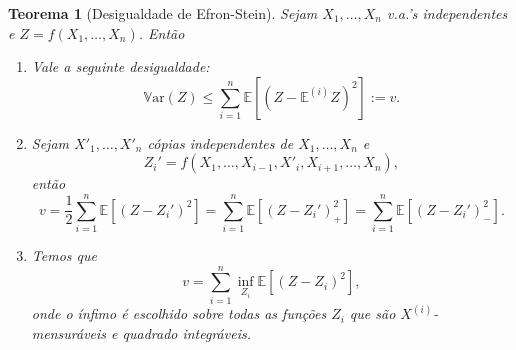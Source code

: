 \documentclass[12pt,a4paper,oneside]{book}
\newtheorem{theorem}{Teorema}[section]
\theoremstyle{definition}
\theoremstyle{remark}
\numberwithin{equation}{section}
\newcommand{\E}{\mathbb{E}}
\newcommand{\Var}{\mathbb{V}\text{ar}}
\begin{document}
\begin{theorem}[Desigualdade de Efron-Stein]\label{des-efron-stein} Sejam $X_1,\dots, X_n$ v.a.'s independentes e $Z = f(X_1,\dots,X_n)$. Então
\begin{enumerate}
\item Vale a seguinte desigualdade:
$$\Var(Z)\leq \sum_{i=1}^n \E\left[\left( Z-\E^{(i)}Z\right)^2\right] := v . $$
\item Sejam $X'_1,\dots, X'_n$ cópias independentes de $X_1,\dots, X_n$ e  
$$Z_i' = f(X_1,\dots,X_{i-1},X'_i,X_{i+1},\dots,X_n),$$ então
$$v = \dfrac{1}{2}\sum_{i=1}^n\E\left[\left(Z-Z_i' \right)^2\right]=\sum_{i=1}^n\E\left[\left(Z-Z_i' \right)_+^2\right]=\sum_{i=1}^n\E\left[\left(Z-Z_i' \right)_-^2\right]. $$

\item Temos que
$$v =  \sum_{i=1}^n  \inf_{Z_i}\E\left[(Z-Z_i)^2\right], $$
onde o ínfimo é escolhido sobre todas as funções $Z_i$ que são $X^{(i)}$-mensuráveis e quadrado integráveis.
\end{enumerate}
\end{theorem}
\end{document}
